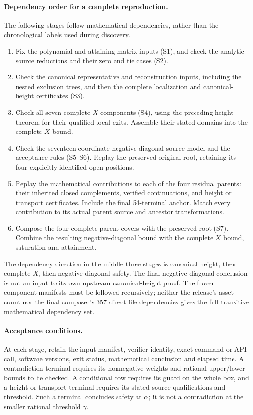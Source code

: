 \documentclass[11pt,reqno]{amsart}
\theoremstyle{definition}
\theoremstyle{remark}
\begin{document}
\paragraph{Dependency order for a complete reproduction.}
The following stages follow mathematical dependencies, rather than the
chronological labels used during discovery.
\begin{enumerate}
\item Fix the polynomial and attaining-matrix inputs (S1), and check
      the analytic source reductions and their zero and tie cases (S2).
\item Check the canonical representative and reconstruction inputs,
      including the nested exclusion trees, and then the complete
      localization and canonical-height certificates (S3).
\item Check all seven complete-\(X\) components (S4), using the preceding
      height theorem for their qualified local exits. Assemble their
      stated domains into the complete \(X\) bound.
\item Check the seventeen-coordinate negative-diagonal source model
      and the acceptance rules (S5--S6). Replay the preserved original
      root, retaining its four explicitly identified open positions.
\item Replay the mathematical contributions to each of the four
      residual parents: their inherited closed complements, verified
      continuations, and height or transport certificates. Include the
      final 54-terminal anchor. Match every contribution to its actual
      parent source and ancestor transformations.
\item Compose the four complete parent covers with the preserved root
      (S7). Combine the resulting negative-diagonal bound with the
      complete \(X\) bound, saturation and attainment.
\end{enumerate}
The dependency direction in the middle three stages is canonical
height, then complete \(X\), then negative-diagonal safety. The final
negative-diagonal conclusion is not an input to its own upstream
canonical-height proof. The frozen component manifests must be
followed recursively; neither the release's asset count nor the final
composer's 357 direct file dependencies gives the full transitive
mathematical dependency set.

\paragraph{Acceptance conditions.}
At each stage, retain the input manifest, verifier identity, exact
command or API call, software versions, exit status, mathematical
conclusion and elapsed time. A contradiction terminal requires its
nonnegative weights and rational upper/lower bounds to be checked.
A conditional row requires its guard on the whole box, and a height
or transport terminal requires its stated source qualifications and
threshold. Such a terminal concludes safety at \(\alpha\); it is not
a contradiction at the smaller rational threshold \(\gamma\).
\end{document}
